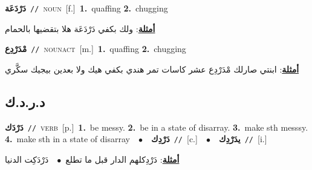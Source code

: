 \documentclass[10pt,a4paper,twoside]{article} %
\begin{document}
\begin{multicols}{2}
{\setlength\topsep{0pt}\textbf{\foreignlanguage{arabic}{دَرْدَعَة}}\ {\color{gray}\texttt{//}\color{black}}\ \textsc{noun}\ [f.]\ \textbf{1.}~quaffing  \textbf{2.}~chugging\  \begin{flushright}\color{gray}\foreignlanguage{arabic}{\textbf{\underline{\foreignlanguage{arabic}{أمثلة}}}: ولك بكفي دَرْدَعَة هلا بتقضيها بالحمام}\end{flushright}\color{black}} \vspace{2mm}

{\setlength\topsep{0pt}\textbf{\foreignlanguage{arabic}{مْدَرْدِع}}\ {\color{gray}\texttt{//}\color{black}}\ \textsc{noun\textunderscore act}\ [m.]\ \textbf{1.}~quaffing  \textbf{2.}~chugging\  \begin{flushright}\color{gray}\foreignlanguage{arabic}{\textbf{\underline{\foreignlanguage{arabic}{أمثلة}}}: ابنتي صارلك مْدَرْدِع عشر كاسات تمر هندي بكفي هيك ولا بعدين بيجيك سكَّري}\end{flushright}\color{black}} \vspace{2mm}

\vspace{-3mm}
\subsection*{\color{blue}\foreignlanguage{arabic}{د.ر.د.ك}\color{blue}{}} 

{\setlength\topsep{0pt}\textbf{\foreignlanguage{arabic}{دَرْدَك}}\ {\color{gray}\texttt{//}\color{black}}\ \textsc{verb}\ [p.]\ \textbf{1.}~be messy.  \textbf{2.}~be in a state of disarray.  \textbf{3.}~make sth messsy.  \textbf{4.}~make sth in a state of disarray\ \ $\bullet$\ \ \setlength\topsep{0pt}\textbf{\foreignlanguage{arabic}{دَرْدِك}}\ {\color{gray}\texttt{//}\color{black}}\ [c.]\ \ $\bullet$\ \ \setlength\topsep{0pt}\textbf{\foreignlanguage{arabic}{يدَرْدِك}}\ {\color{gray}\texttt{//}\color{black}}\ [i.]\  \begin{flushright}\color{gray}\foreignlanguage{arabic}{\textbf{\underline{\foreignlanguage{arabic}{أمثلة}}}: دَرْدِكلهم الدار قبل ما تطلع\ $\bullet$\ \  دَرْدَكِت الدنيا}\end{flushright}\color{black}} \vspace{2mm}


\end{multicols}
\end{document}
